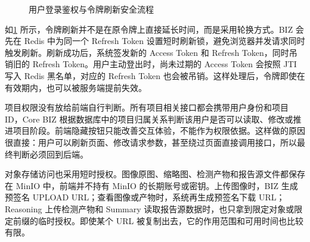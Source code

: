 \begin{figure}[!htb]
{
  }
  \caption{用户登录鉴权与令牌刷新安全流程}\label{fig:implementation-auth-token-security-flow}
\end{figure}

如\cref{fig:implementation-auth-token-security-flow} 所示，令牌刷新并不是在原令牌上直接延长时间，而是采用轮换方式。BIZ 会先在 Redis 中为同一个 Refresh Token 设置短时刷新锁，避免浏览器并发请求同时触发刷新。刷新成功后，系统签发新的 Access Token 和 Refresh Token，同时吊销旧的 Refresh Token。用户主动登出时，尚未过期的 Access Token 会按照 JTI 写入 Redis 黑名单，对应的 Refresh Token 也会被吊销。这样处理后，令牌即使在有效期内，也可以被服务端提前失效。

项目权限没有放给前端自行判断。所有项目相关接口都会携带用户身份和项目 ID，Core BIZ 根据数据库中的项目归属关系判断该用户是否可以读取、修改或推进项目阶段。前端隐藏按钮只能改善交互体验，不能作为权限依据。这样做的原因很直接：用户可以刷新页面、修改请求参数，甚至绕过页面直接调用接口，所以最终判断必须回到后端。

对象存储访问也采用短时授权。图像原图、缩略图、检测产物和报告源文件都保存在 MinIO 中，前端并不持有 MinIO 的长期账号或密钥。上传图像时，BIZ 生成预签名 UPLOAD URL；查看图像或产物时，系统再生成预签名下载 URL；Reasoning 上传检测产物和 Summary 读取报告源数据时，也只拿到限定对象或限定前缀的临时授权。即使某个 URL 被复制出去，它的作用范围和可用时间也比较有限。

